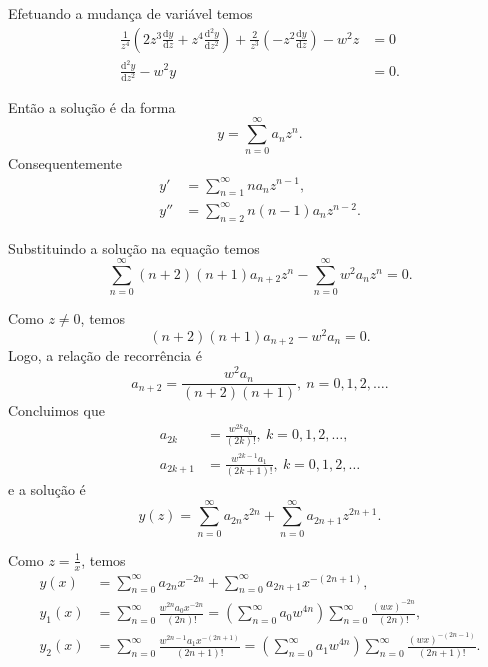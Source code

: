 \documentclass[a4paper,12pt, leqno, answers]{exam}
\newcommand{\devd}[2]{\frac{\mathrm{d} #1}{\mathrm{d} #2}}
\newcommand{\devdt}[2]{\frac{\mathrm{d}^2 #1}{\mathrm{d} #2^2}}
\begin{document}
\begin{questions}
\begin{solution}
        Efetuando a mudan\c{c}a de vari\'{a}vel temos
        \begin{align*}
            \frac{1}{z^4} \left( 2 z^3 \devd{y}{z} + z^4 \devdt{y}{z} \right) + \frac{2}{z^3} \left( - z^2 \devd{y}{z} \right) - w^2 z &= 0 \\
            \devdt{y}{z} - w^2 y &= 0.
        \end{align*}

        Ent\~{a}o a solu\c{c}\~{a}o \'{e} da forma
        \[
        y = \sum_{n = 0}^\infty a_n z^n.
        \]
        Consequentemente
        \begin{align*}
            y' &= \sum_{n = 1}^\infty n a_n z^{n - 1}, \\
            y'' &= \sum_{n = 2}^\infty n \left( n - 1 \right) a_n z^{n - 2}.
        \end{align*}

        Substituindo a solu\c{c}\~{a}o na equa\c{c}\~{a}o temos
        \[
        \sum_{n = 0}^\infty \left( n + 2 \right) \left( n + 1 \right) a_{n + 2} z^n - \sum_{n = 0}^\infty w^2 a_n z^n = 0.
        \]

        Como $z \neq 0$, temos
        \[
        \left( n + 2 \right) \left( n + 1 \right) a_{n + 2} - w^2 a_n = 0.
        \]
        Logo, a rela\c{c}\~{a}o de recorr\^{e}ncia \'{e}
        \[
        a_{n + 2} = \frac{w^2 a_n}{\left( n + 2 \right) \left( n + 1 \right)}, \ n = 0, 1, 2, \ldots.
        \]
        Concluimos que
        \begin{align*}
            a_{2k} &= \frac{w^{2k} a_0}{\left( 2k \right)!}, \ k = 0, 1, 2, \ldots, \\
            a_{2k + 1} &= \frac{w^{2 k - 1} a_1}{\left( 2k + 1 \right)!}, \ k = 0, 1, 2, \ldots
        \end{align*}
        e a solu\c{c}\~{a}o \'{e}
        \[
        y(z) = \sum_{n = 0}^\infty a_{2n} z^{2n} + \sum_{n = 0}^\infty a_{2n + 1} z^{2n + 1}.
        \]

        Como $z = \frac{1}{x}$, temos
        \begin{align*}
            y(x) &= \sum_{n = 0}^\infty a_{2n} x^{-2n} + \sum_{n = 0}^\infty a_{2n + 1} x^{-\left( 2n + 1 \right)}, \\
            y_1(x) &= \sum_{n = 0}^\infty \frac{w^{2n} a_0 x^{-2n}}{\left( 2n \right)!} = \left( \sum_{n = 0}^\infty a_0 w^{4n} \right) \sum_{n = 0}^\infty \frac{\left( w x \right)^{-2n}}{\left( 2n \right)!}, \\
            y_2(x) &= \sum_{n = 0}^\infty \frac{w^{2n - 1} a_1 x^{-\left( 2n + 1 \right)}}{\left( 2n + 1 \right)!} = \left( \sum_{n = 0}^\infty a_1 w^{4n} \right) \sum_{n = 0}^\infty \frac{\left( w x \right)^{-\left( 2n - 1 \right)}}{\left( 2n + 1 \right)!}.
        \end{align*}
    \end{solution}


\end{questions}
\end{document}
